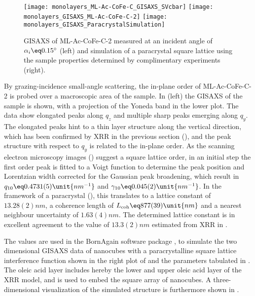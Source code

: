 \documentclass[\main/dresen_thesis.tex]{subfiles}
\begin{document}
  \label{sec:monolayers:structure:squareArrayParacrystalGISAXS}
  \begin{figure}[tb]
    \centering
    \texttt{[image: monolayers\_ML-Ac-CoFe-C\_GISAXS\_SVcbar]}
    \texttt{[image: monolayers\_GISAXS\_ML-Ac-CoFe-C-2]}
    \texttt{[image: monolayers\_GISAXS\_ParacrystalSimulation]}
    \caption{\label{fig:monolayers:structure:ML-Ac-CoFe-C-2:GISAXS}GISAXS of ML-Ac-CoFe-C-2 measured at an incident angle of $\alpha_i \eq 0.15^\circ$ (left) and simulation of a paracrystal square lattice using the sample properties determined by complimentary experiments (right).}
  \end{figure}
  By grazing-incidence small-angle scattering, the in-plane order of ML-Ac-CoFe-C-2 is probed over a macroscopic area of the sample.
  In  (left) the GISAXS of the sample is shown, with a projection of  the Yoneda band in the lower plot.
  The data show elongated peaks along $\mathit{q_z}$ and multiple sharp peaks emerging along $\mathit{q_y}$.
  The elongated peaks hint to a thin layer structure along the vertical direction, which has been confirmed by XRR in the previous section (), and the peak structure with respect to $\mathit{q_y}$ is related to the in-plane order.
  As the scanning electron microscopy images () suggest a square lattice order, in an initial step the first order peak is fitted to a Voigt function to determine the peak position and Lorentzian width corrected for the Gaussian peak broadening,  which result in $q_{10} \eq 0.4731(5) \unit{nm^{-1}}$ and $\gamma_{10} \eq 0.045(2) \unit{nm^{-1}}$.
  In the framework of a paracrystal (), this translates to a lattice constant of $13.28(2) \unit{nm}$, a coherence length of $L_{\mathrm{coh}} \eq 877(39) \unit{nm}$ and a nearest neighbour uncertainty of $1.63(4) \unit{nm}$.
  The determined lattice constant is in excellent agreement to the value of $13.3(2) \unit{nm}$ estimated from XRR in .

  The values are used in the BornAgain software package \cite{Burle_2018_borna}, to simulate the two dimensional GISAXS data of nanocubes with a paracrystalline square lattice interference function shown in the right plot of  and the parameters tabulated in .
  The oleic acid layer includes hereby the lower and upper oleic acid layer of the XRR model, and is used to embed the square array of nanocubes.
  A three-dimensional visualization of the simulated structure is furthermore shown in .
\end{document}

